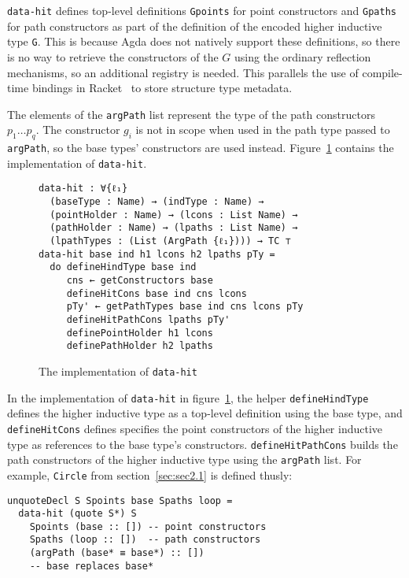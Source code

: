 \documentclass[sigplan,10pt]{acmart}
\begin{document}
\texttt{data-hit} defines top-level definitions \texttt{Gpoints} for point constructors and \texttt{Gpaths} for path constructors as part of the definition of the encoded higher inductive type \texttt{G}.
This is because Agda does not natively support these definitions, so there is no way to retrieve the constructors of the $G$ using the ordinary reflection mechanisms, so an additional registry is needed.
This parallels the use of compile-time bindings in Racket~\citep{compilemacro} to store structure type metadata.


The elements of the {\tt argPath} list represent the type of the path constructors $p_1 \ldots p_q$.
The constructor $g_i$ is not in scope when used in the path type passed to {\tt argPath}, so the base types' constructors are used instead.
Figure~\ref{fig:data-hit} contains the implementation of \texttt{data-hit}.

\begin{figure}
\begin{center}
\begingroup
\begin{Verbatim}
data-hit : ∀{ℓ₁} 
  (baseType : Name) → (indType : Name) →
  (pointHolder : Name) → (lcons : List Name) →
  (pathHolder : Name) → (lpaths : List Name) →
  (lpathTypes : (List (ArgPath {ℓ₁}))) → TC ⊤
data-hit base ind h1 lcons h2 lpaths pTy =
  do defineHindType base ind
     cns ← getConstructors base
     defineHitCons base ind cns lcons
     pTy' ← getPathTypes base ind cns lcons pTy
     defineHitPathCons lpaths pTy'
     definePointHolder h1 lcons
     definePathHolder h2 lpaths
\end{Verbatim}
\endgroup
\end{center}
\caption{The implementation of {\tt data-hit}}
\label{fig:data-hit}
\end{figure}
\normalsize

In the implementation of {\tt data-hit} in figure~\ref{fig:data-hit}, the helper \texttt{defineHindType} defines the higher inductive type as a top-level definition using the base type, and 
\texttt{defineHitCons} defines specifies the point constructors of the higher inductive type as references to the base type's constructors.
{\tt defineHitPathCons} builds the path constructors of the higher inductive type using the {\tt argPath} list. For example, {\tt Circle} from section~\ref{sec:sec2.1} is defined thusly:
\begin{center}
\begingroup
\begin{BVerbatim}
unquoteDecl S Spoints base Spaths loop =
  data-hit (quote S*) S
    Spoints (base :: []) -- point constructors
    Spaths (loop :: [])  -- path constructors
    (argPath (base* ≡ base*) :: []) 
    -- base replaces base*
\end{BVerbatim}
\endgroup
\end{center}
\end{document}
